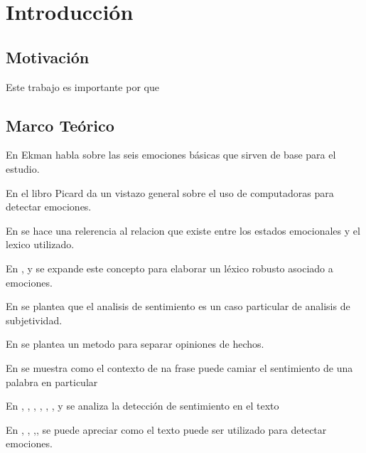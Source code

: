 \chapter{Introducción}






\section{Motivación}

Este trabajo es importante por que 



\section{Marco Teórico}

En \cite{ekman1993facial} Ekman habla sobre las seis emociones básicas que sirven de base para el estudio.

En el libro \cite{picard2000affective} Picard da un vistazo general sobre el uso de computadoras para detectar emociones.

En \cite{ortony1987referential} se hace una relerencia al relacion que existe entre los estados emocionales y el lexico utilizado.


En \cite{hatzivassiloglou1997predicting}, \cite{strapparava2004wordnet} y \cite{esuli2006sentiwordnet} se expande este concepto para elaborar un léxico robusto asociado a emociones.

En \cite{wiebe1994tracking} se plantea que el analisis de sentimiento es un caso particular de analisis de subjetividad.


En \cite{yu2003towards} se plantea un metodo para separar opiniones de hechos.

En \cite{wilson2009recognizing} se muestra como el contexto de na frase puede camiar el sentimiento de una palabra en particular



En \cite{pang2002thumbs}, \cite{pang2004sentimental}, \cite{dave2003mining}, \cite{wilson2005recognizing}, \cite{turney2002thumbs}, \cite{nasukawa2003sentiment}, \cite{kim2004determining} y  se analiza la detección de sentimiento en el texto

En \cite{wiebe2005annotating}\cite{strapparava2008learning}, \cite{strapparava2007semeval}, \cite{alm2005emotions},\cite{aman2007identifying}, \cite{liu2003model}  se puede apreciar como el texto puede ser utilizado para detectar emociones.


